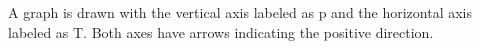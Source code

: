 A graph is drawn with the vertical axis labeled as p and the horizontal axis labeled as T. Both axes have arrows indicating the positive direction.